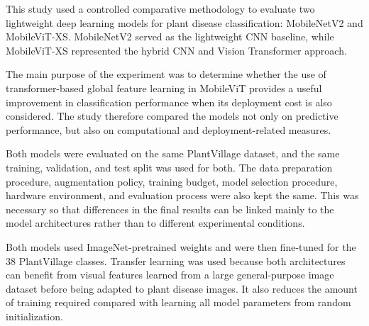 \documentclass[conference]{IEEEtran}
\begin{document}
This study used a controlled comparative methodology to evaluate two lightweight deep learning models for plant disease classification: MobileNetV2 and MobileViT-XS. MobileNetV2 served as the lightweight CNN baseline, while MobileViT-XS represented the hybrid CNN and Vision Transformer approach.

The main purpose of the experiment was to determine whether the use of transformer-based global feature learning in MobileViT provides a useful improvement in classification performance when its deployment cost is also considered. The study therefore compared the models not only on predictive performance, but also on computational and deployment-related measures.

Both models were evaluated on the same PlantVillage dataset, and the same training, validation, and test split was used for both. The data preparation procedure, augmentation policy, training budget, model selection procedure, hardware environment, and evaluation process were also kept the same. This was necessary so that differences in the final results can be linked mainly to the model architectures rather than to different experimental conditions.

Both models used ImageNet-pretrained weights and were then fine-tuned for the 38 PlantVillage classes. Transfer learning was used because both architectures can benefit from visual features learned from a large general-purpose image dataset before being adapted to plant disease images. It also reduces the amount of training required compared with learning all model parameters from random initialization.
\end{document}
